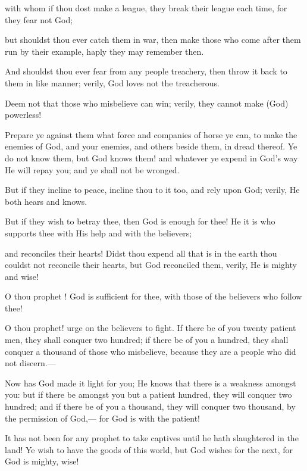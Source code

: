 \documentclass[fontsize=14pt, letterpaper, notitlepage, openany, DIV=12]{scrbook} %
\begin{document}
\noindent[8:56]
with whom if thou dost make a league, they break their league each time, for they fear
not God;

\noindent[8:57]
but shouldst thou ever catch them in war, then make those who come after them run by
their example, haply they may remember then.

\noindent[8:58]
And shouldst thou ever fear from any people treachery, then throw it back to them in like
manner; verily, God loves not the treacherous.

\noindent[8:59]
Deem not that those who misbelieve can win; verily, they cannot make (God) powerless!

\noindent[8:60]
Prepare ye against them what force and companies of horse ye can, to make the enemies
of God, and your enemies, and others beside them, in dread thereof. Ye do not know them, but
God knows them! and whatever ye expend in God's way He will repay you; and ye shall not be
wronged.

\noindent[8:61]
But if they incline to peace, incline thou to it too, and rely upon God; verily, He both
hears and knows.

\noindent[8:62]
But if they wish to betray thee, then God is enough for thee! He it is who supports thee
with His help and with the believers;

\noindent[8:63]
and reconciles their hearts! Didst thou expend all that is in the earth thou couldst not
reconcile their hearts, but God reconciled them, verily, He is mighty and wise!

\noindent[8:64]
O thou prophet ! God is sufficient for thee, with those of the believers who follow thee!

\noindent[8:65]
O thou prophet! urge on the believers to fight. If there be of you twenty patient men, they
shall conquer two hundred; if there be of you a hundred, they shall conquer a thousand of those
who misbelieve, because they are a people who did not discern.---

\noindent[8:66]
Now has God made it light for you; He knows that there is a weakness amongst you: but
if there be amongst you but a patient hundred, they will conquer two hundred; and if there be of
you a thousand, they will conquer two thousand, by the permission of God,--- for God is with the
patient!

\noindent[8:67]
It has not been for any prophet to take captives until he hath slaughtered in the land! Ye
wish to have the goods of this world, but God wishes for the next, for God is mighty, wise!
\end{document}
